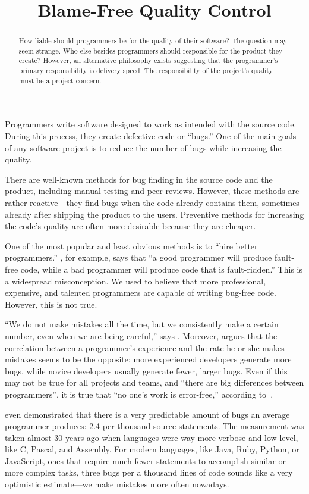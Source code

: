 \documentclass{main}
\title{Blame-Free Quality Control}
\begin{document}
\begin{abstract}
How liable should programmers be for the quality of their software?
The question may seem strange. Who else besides programmers should
responsible for the product they create? However, an alternative philosophy exists
suggesting that the programmer's primary responsibility is delivery speed. The
responsibility of the project's quality must be a project concern.
\end{abstract}

Programmers write software designed to work as intended with the source code. During this process,
they create defective code or ``bugs.''
One of the main
goals of any software project is to reduce the number of bugs while increasing the
quality.

There are well-known methods for bug finding in the source code and the product, including manual
testing and peer reviews. However, these methods are rather reactive---they find bugs when
the code already contains them, sometimes already after shipping the product to the
users.
Preventive methods for increasing the code's quality are often more desirable because they are cheaper.

One of the most popular and least obvious methods is to ``hire
better programmers.''
\textcite{munson2003},
for example, says that ``a good programmer will produce fault-free code, while
a bad programmer will produce code that is fault-ridden.''
This is a widespread misconception.
We used to believe that more professional, expensive, and talented
programmers are capable of writing bug-free code. However, this is not true.

``We do not make mistakes all the time, but we consistently
make a certain number, even when we are being careful,'' says
\textcite{panko1996}.
Moreover, \textcite{yb-bugfree14} argues that the correlation
between a programmer's experience and the rate he or she makes mistakes seems to be the opposite:
more experienced developers generate more bugs,
while novice developers usually generate fewer, larger bugs.
Even if this may not be true for all projects and teams, and
``there are big differences between programmers'', it is
true that ``no one's work is error-free,'' according to~\textcite{kaner99}.

\textcite{beizer1990} even demonstrated that there is
a very predictable amount of bugs an average programmer produces:
2.4 per thousand source statements. The measurement was taken almost 30
years ago when languages were way more verbose and low-level, like C, Pascal,
and Assembly. For modern languages, like Java, Ruby, Python, or JavaScript, ones that require
much fewer statements to accomplish similar or more complex tasks, three
bugs per a thousand lines of code sounds like a very optimistic estimate---we
make mistakes more often nowadays.
\end{document}
